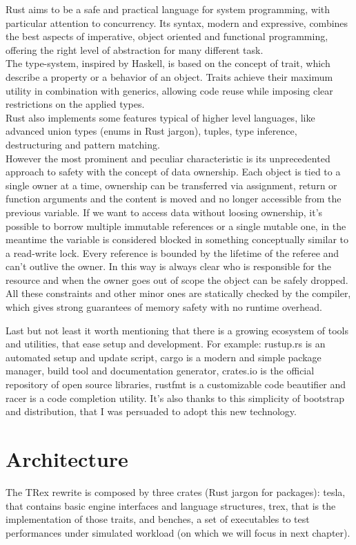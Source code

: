 Rust aims to be a safe and practical language for system programming, with particular attention to concurrency. Its syntax, modern and expressive, combines the best aspects of imperative, object oriented and functional programming, offering the right level of abstraction for many different task.\\
The type-system, inspired by Haskell, is based on the concept of trait, which describe a property or a behavior of an object. Traits achieve their maximum utility in combination with generics, allowing code reuse while imposing clear restrictions on the applied types.\\
Rust also implements some features typical of higher level languages, like advanced union types (enums in Rust jargon), tuples, type inference, destructuring and pattern matching.\\
However the most prominent and peculiar characteristic is its unprecedented approach to safety with the concept of data ownership. Each object is tied to a single owner at a time, ownership can be transferred via assignment, return or function arguments and the content is moved and no longer accessible from the previous variable. If we want to access data without loosing ownership, it's possible to borrow multiple immutable references or a single mutable one, in the meantime the variable is considered blocked in something conceptually similar to a read-write lock. Every reference is bounded by the lifetime of the referee and can't outlive the owner. In this way is always clear who is responsible for the resource and when the owner goes out of scope the object can be safely dropped.\\
All these constraints and other minor ones are statically checked by the compiler, which gives strong guarantees of memory safety with no runtime overhead.

Last but not least it worth mentioning that there is a growing ecosystem of tools and utilities, that ease setup and development. For example: rustup.rs is an automated setup and update script, cargo is a modern and simple package manager, build tool and documentation generator, crates.io is the official repository of open source libraries, rustfmt is a customizable code beautifier and racer is a code completion utility. It's also thanks to this simplicity of bootstrap and distribution, that I was persuaded to adopt this new technology.

\section{Architecture}
The TRex rewrite is composed by three crates (Rust jargon for packages): tesla, that contains basic engine interfaces and language structures, trex, that is the implementation of those traits, and benches,  a set of executables to test performances under simulated workload (on which we will focus in next chapter).

